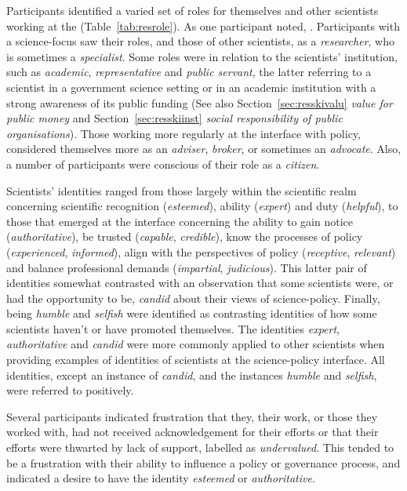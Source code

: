Participants identified a varied set of roles for themselves and other scientists working at the \SPI{} (Table~\ref{tab:resrole}). As one participant noted, . Participants with a science-focus saw their roles, and those of other scientists, as a \emph{researcher}, who is sometimes a \emph{specialist}. Some roles were in relation to the scientists' institution, such as \emph{academic}, \emph{representative} and \emph{public servant}, the latter referring to a scientist in a government science setting or in an academic institution with a strong awareness of its public funding (See also Section~\ref{sec:resskivalu} \emph{value for public money} and Section~\ref{sec:resskiinst} \emph{social responsibility of public organisations}). Those working more regularly at the interface with policy, considered themselves more as an \emph{adviser}, \emph{broker}, or sometimes an \emph{advocate}. Also, a number of participants were conscious of their role as a \emph{citizen}.

Scientists' identities ranged from those largely within the scientific realm concerning scientific recognition (\emph{esteemed}), ability (\emph{expert}) and duty (\emph{helpful}), to those that emerged at the interface concerning the ability to gain notice (\emph{authoritative}), be trusted (\emph{capable}, \emph{credible}), know the processes of policy (\emph{experienced}, \emph{informed}), align with the perspectives of policy (\emph{receptive}, \emph{relevant}) and balance professional demands (\emph{impartial}, \emph{judicious}). This latter pair of identities somewhat contrasted with an observation that some scientists were, or had the opportunity to be, \emph{candid} about their views of \CAN{} science-policy. Finally, being \emph{humble} and \emph{selfish} were identified as contrasting identities of how some scientists haven't or have promoted themselves. The identities \emph{expert}, \emph{authoritative} and \emph{candid} were more commonly applied to other scientists when providing examples of identities of scientists at the science-policy interface. All identities, except an instance of \emph{candid}, and the instances \emph{humble} and \emph{selfish}, were referred to positively.

Several participants indicated frustration that they, their work, or those they worked with, had not received acknowledgement for their efforts or that their efforts were thwarted by lack of support, labelled as \emph{undervalued}. This tended to be a frustration with their ability to influence a policy or governance process, and indicated a desire to have the identity \emph{esteemed} or \emph{authoritative}.

